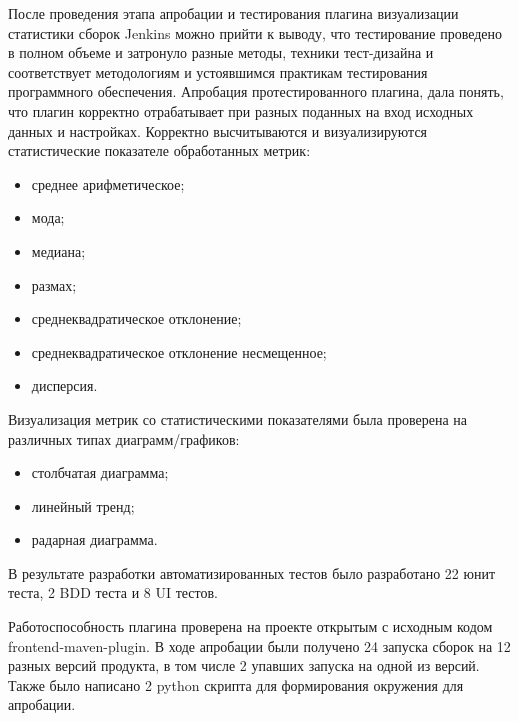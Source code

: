 После проведения этапа апробации и тестирования плагина визуализации статистики сборок Jenkins можно прийти к выводу, что тестирование проведено в полном объеме и затронуло разные методы, техники тест-дизайна и соответствует методологиям и устоявшимся практикам тестирования программного обеспечения. Апробация протестированного плагина, дала понять, что плагин корректно отрабатывает при разных поданных на вход исходных данных и настройках. Корректно высчитываются и визуализируются статистические показателе обработанных метрик:

\begin{itemize}
	\item среднее арифметическое;
	\item мода;
	\item медиана;
	\item размах;
	\item среднеквадратическое отклонение;
	\item среднеквадратическое отклонение несмещенное;
	\item дисперсия.
\end{itemize}

Визуализация метрик со статистическими показателями была проверена на различных типах диаграмм/графиков:

\begin{itemize}
	\item столбчатая диаграмма;
	\item линейный тренд;
	\item радарная диаграмма.
\end{itemize}

В результате разработки автоматизированных тестов было разработано 22 юнит теста, 2 BDD теста и 8 UI тестов.

Работоспособность плагина проверена на проекте открытым с исходным кодом frontend-maven-plugin. В ходе апробации были получено 24 запуска сборок на 12 разных версий продукта, в том числе 2 упавших запуска на одной из версий. Также было написано 2 python скрипта для формирования окружения для апробации.






%
%

%
%






